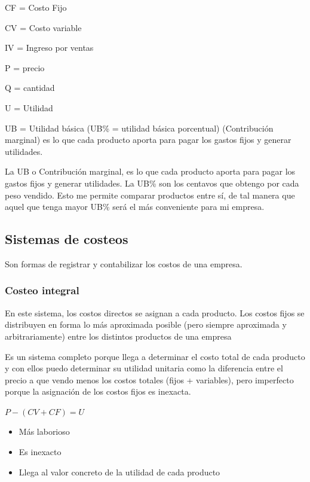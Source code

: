 \documentclass[titlepage,a4paper]{article}
\begin{document}
CF = Costo Fijo

CV = Costo variable

IV = Ingreso por ventas

P = precio

Q = cantidad

U = Utilidad

UB = Utilidad básica (UB\% = utilidad básica porcentual) (Contribución marginal) es lo que cada producto aporta para pagar los gastos fijos y generar utilidades.

La UB o Contribución marginal, es lo que cada producto aporta para pagar los gastos fijos y generar utilidades. La UB\% son los centavos que obtengo por cada peso vendido. Esto me permite comparar productos entre sí, de tal manera que aquel que tenga mayor UB\% será el más conveniente para mi empresa.

\subsection{Sistemas de costeos}
Son formas de registrar y contabilizar los costos de una empresa. 

\subsubsection*{Costeo integral}
En este sistema, los costos directos se asignan a cada producto. Los costos fijos se distribuyen en forma lo más aproximada posible (pero siempre aproximada y arbitrariamente) entre los distintos productos de una empresa

Es un sistema completo porque llega a determinar el costo total de cada producto y con ellos puedo determinar su utilidad unitaria como la diferencia entre el precio a que vendo menos los costos totales (fijos + variables), pero imperfecto porque la asignación de los costos fijos es inexacta.

\begin{center}
\begin{math}
P - (CV + CF) = U
\end{math}
\end{center}

\begin{itemize}
    \item Más laborioso
    \item Es inexacto
    \item Llega al valor concreto de la utilidad de cada producto
\end{itemize}
\end{document}
